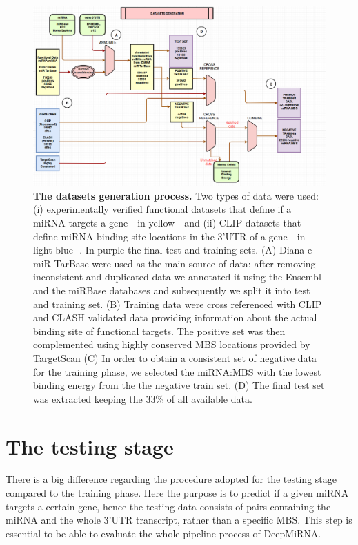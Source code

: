 \begin{figure}[hbt!]
	\centering
	\includegraphics[width=1\textwidth]{Figures/training}
	\caption{\textbf{The datasets generation process.} Two types of data were used: (i) experimentally verified functional datasets that define if a miRNA targets a gene - in yellow - and (ii) CLIP datasets that define miRNA binding site locations in the 3'UTR of a gene - in light blue -. In purple the final test and training sets. (A) Diana e miR TarBase were used as the main source of data: after removing inconsistent and duplicated data we annotated it using the Ensembl and the miRBase databases and subsequently we split it into test and training set. (B) Training data were cross referenced with CLIP and CLASH validated data providing information about the actual binding site of functional targets. The positive set was then complemented using highly conserved MBS locations provided by TargetScan (C) In order to obtain a consistent set of negative data for the training phase, we selected the miRNA:MBS with the lowest binding energy from the the negative train set. (D) The final test set was extracted keeping the 33\% of all available data.}
	\label{fig:training}
\end{figure}

\section{The testing stage}
There is a big difference regarding the procedure adopted for the testing stage compared to the training phase. Here the purpose is to predict if a given miRNA targets a certain gene, hence the testing data consists of pairs containing the miRNA and the whole 3'UTR transcript, rather than a specific MBS. This step is essential to be able to evaluate the whole pipeline process of DeepMiRNA.

